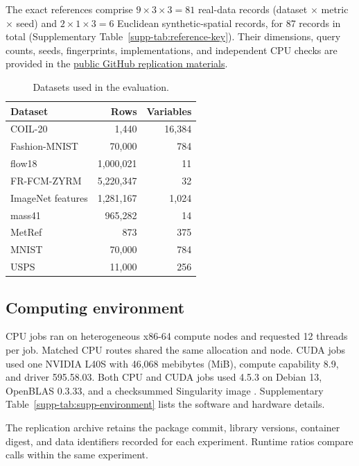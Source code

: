 \documentclass[article]{jss}
\begin{document}
The exact references comprise $9\times3\times3=81$ real-data records
(dataset $\times$ metric $\times$ seed) and $2\times1\times3=6$ Euclidean
synthetic-spatial records, for 87 records in total
(Supplementary Table~\ref{supp-tab:reference-key}).
Their dimensions, query counts, seeds, fingerprints, implementations, and
independent CPU checks are provided in the
\href{https://github.com/tkcaccia/faissR/tree/main/manuscript/jss}{public
GitHub replication materials}.

\begin{table}[t]
\centering

\begin{tabular}{@{}lrr@{}}
\toprule
Dataset & Rows & Variables \\
\midrule
COIL-20 & 1,440 & 16,384 \\
Fashion-MNIST & 70,000 & 784 \\
flow18 & 1,000,021 & 11 \\
FR-FCM-ZYRM & 5,220,347 & 32 \\
ImageNet features & 1,281,167 & 1,024 \\
mass41 & 965,282 & 14 \\
MetRef & 873 & 375 \\
MNIST & 70,000 & 784 \\
USPS & 11,000 & 256 \\
\bottomrule
\end{tabular}
\caption{Datasets used in the evaluation.}
\label{tab:datasets}
\end{table}

\subsection{Computing environment}
\label{sec:computing-environment}

CPU jobs ran on heterogeneous x86-64 compute nodes and requested 12 threads
per job. Matched CPU routes shared the same allocation and node. CUDA jobs used
one NVIDIA L40S with 46,068 mebibytes (MiB), compute capability 8.9, and driver
595.58.03. Both CPU and CUDA jobs used  4.5.3 on Debian 13,
OpenBLAS 0.3.33, and a checksummed Singularity image \citep{Singularity}.
Supplementary
Table~\ref{supp-tab:supp-environment}
lists the software and hardware details.

The replication archive retains the package commit, library versions,
container digest, and data identifiers recorded for each experiment. Runtime
ratios compare calls within the same experiment.
\end{document}
